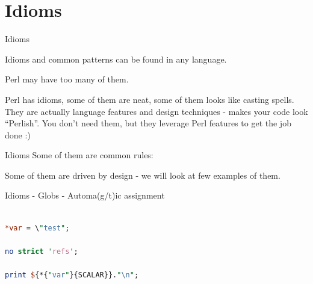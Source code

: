 \documentclass[10pt]{beamer}
\begin{document}
\section{Idioms}
\begin{frame}[fragile]{Idioms}

Idioms and common patterns can be found in any language.
\item
Perl may have too many of them.

Perl has idioms, some of them are neat, some of them looks like casting spells. They are actually language features and design techniques - makes your code look ``Perlish''.
 You don't need them, but they leverage Perl features to get the job done  :)

\end{frame}

\begin{frame}[fragile]{Idioms}
Some of them are common rules:


Some of them are driven by design - we will look at few examples of them.
\end{frame}



\begin{frame}[fragile]{Idioms - Globs - Automa(g/t)ic assignment }

\begin{lstlisting}[language=perl]

*var = \"test";                      
 
no strict 'refs';

print ${*{"var"}{SCALAR}}."\n";    

\end{lstlisting}
\pause



\end{frame}
\end{document}
